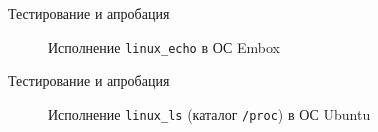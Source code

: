 \documentclass[english,russian,aspectratio=169]{beamer}
\begin{document}
\begin{frame}{Тестирование и апробация}
\begin{figure}[h]
\caption{{Исполнение \textcolor{MyGrey}{\texttt{linux\_echo} в ОС Embox}}}
\end{figure}
\end{frame}

\begin{frame}{Тестирование и апробация}
\begin{figure}[h]
\caption{Исполнение \textcolor{MyGrey}{\texttt{linux\_ls}} (каталог \textcolor{MyGrey}{\texttt{/proc}}) в ОС Ubuntu}
\end{figure}
\end{frame}
\end{document}
